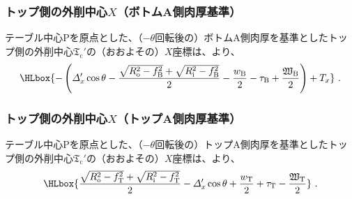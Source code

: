 \subsubsection{トップ側の外削中心\texorpdfstring{$X$}{X}（ボトムA側肉厚基準）}
テーブル中心Pを原点とした、（$-\theta$回転後の）ボトムA側肉厚を基準としたトップ側の外削中心$\mathfrak T_\mathrm c'$の（おおよその）$X$座標は、より、
\begin{align*}
  \HLbox{%
    -\left(
      \varDelta_x'\cos\theta
      -\frac{\sqrt{R_\mathrm o^2-f_\mathrm B^2}+\sqrt{R_\mathrm i^2-f_\mathrm B^2}}2
      -\frac{w_\mathrm B}2
      -\tau_\mathrm B
      +\frac{\mathfrak W_\mathrm B}2
    \right)
    +T_x
  }\ .
\end{align*}

\subsubsection{トップ側の外削中心\texorpdfstring{$X$}{X}（トップA側肉厚基準）}
テーブル中心Pを原点とした、（$-\theta$回転後の）トップA側肉厚を基準としたトップ側の外削中心$\mathfrak T_\mathrm c'$の（おおよその）$X$座標は、より、
\begin{align*}
  \HLbox{%
    \frac{\sqrt{R_\mathrm o^2-f_\mathrm T^2}+\sqrt{R_\mathrm i^2-f_\mathrm T^2}}2
    -\varDelta_x'\cos\theta
    +\frac{w_\mathrm T}2
    +\tau_\mathrm T
    -\frac{\mathfrak W_\mathrm T}2
  }\ .
\end{align*}

